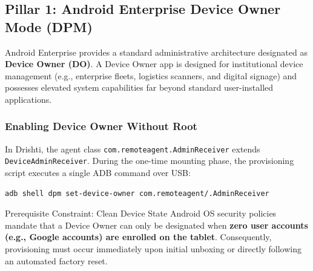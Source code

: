 \documentclass[11pt,a4paper]{article}
\begin{document}
\subsection{Pillar 1: Android Enterprise Device Owner Mode (DPM)}
Android Enterprise provides a standard administrative architecture designated as \textbf{Device Owner (DO)}. A Device Owner app is designed for institutional device management (e.g., enterprise fleets, logistics scanners, and digital signage) and possesses elevated system capabilities far beyond standard user-installed applications.

\subsubsection{Enabling Device Owner Without Root}
In Drishti, the agent class \texttt{com.remoteagent.AdminReceiver} extends \texttt{DeviceAdminReceiver}. During the one-time mounting phase, the provisioning script executes a single ADB command over USB:
\begin{lstlisting}[language=bash]
adb shell dpm set-device-owner com.remoteagent/.AdminReceiver
\end{lstlisting}

\begin{alertbox}{Prerequisite Constraint: Clean Device State}
Android OS security policies mandate that a Device Owner can only be designated when \textbf{zero user accounts (e.g., Google accounts) are enrolled on the tablet}. Consequently, provisioning must occur immediately upon initial unboxing or directly following an automated factory reset.
\end{alertbox}
\end{document}
